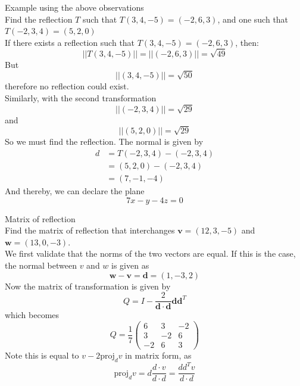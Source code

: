 \documentclass[journal, letterpaper]{IEEEtran}
\begin{document}
    \begin{myboxg}{Example using the above observations} \\ 
        Find the reflection $T$ such that $T(3, 4, -5) = (-2, 6, 3)$, and one such that $T(-2, 3, 4) = (5, 2, 0)$
        \newline \\ 
        If there exists a reflection such that $T(3, 4, -5) = (-2, 6, 3)$, then:
        $$ ||T(3, 4, -5)|| = ||(-2, 6, 3)|| = \sqrt{49}$$
        But $$||(3, 4, -5)|| = \sqrt{50}$$
        therefore no reflection could exist.
        \newline \\
        Similarly, with the second transformation
        $$ ||(-2, 3, 4)|| = \sqrt{29}$$
        and
        $$ ||(5, 2, 0)|| = \sqrt{29}$$
        So we must find the reflection. The normal is given by
        \begin{align*}
         d &= T(-2, 3, 4) - (-2, 3, 4) \\
         &= (5, 2, 0) - (-2, 3, 4) \\
         &= (7, -1, -4)
        \end{align*}
        And thereby, we can declare the plane
        $$ 7x - y - 4z = 0$$
    \end{myboxg}
    \begin{myboxg}{Matrix of reflection} \\ 
        Find the matrix of reflection that interchanges $\mathbf{v} = (12, 3, -5)$ and $\mathbf{w} = (13, 0, -3)$.
        \newline \\ 
        We first validate that the norms of the two vectors are equal. If this is the case, the normal between $v$ and $w$ is given as
        $$ \mathbf{w} - \mathbf{v} = \mathbf{d} = (1, -3, 2)$$
        Now the matrix of transformation is given by
        $$ Q = I - \frac{2}{\mathbf{d}\cdot\mathbf{d}}\mathbf{d}\mathbf{d}^T$$
        which becomes
        $$ Q = \frac{1}{7}\begin{pmatrix}
            6 & 3 & -2 \\ 3 & -2 & 6 \\ -2 & 6 & 3
        \end{pmatrix}$$
        Note this is equal to $v - 2\text{proj}_dv$ in matrix form, as
        $$ \text{proj}_dv = d\frac{d\cdot v}{d\cdot d} = \frac{dd^Tv}{d\cdot d}$$
    \end{myboxg}
\end{document}
